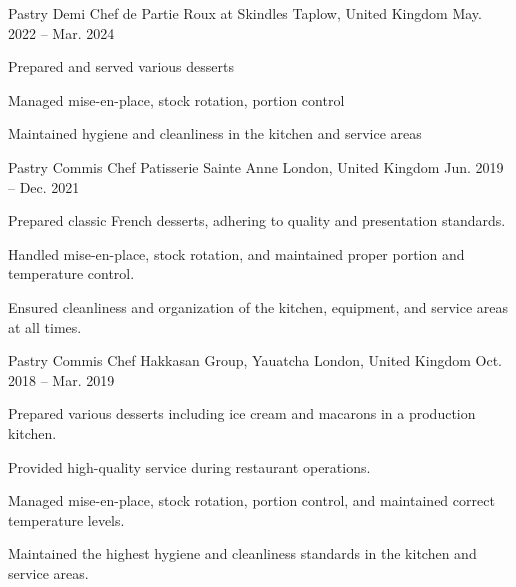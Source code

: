 

\begin{cventries}

  \cventry
    {Pastry Demi Chef de Partie} %
    {Roux at Skindles} %
    {Taplow, United Kingdom} %
    {May. 2022 -- Mar. 2024} %
    {
      \begin{cvitems} %
        \item {Prepared and served various desserts}
        \item {Managed mise-en-place, stock rotation, portion control}
        \item {Maintained hygiene and cleanliness in the kitchen and service areas}
      \end{cvitems}
    }

  \cventry
    {Pastry Commis Chef} %
    {Patisserie Sainte Anne} %
    {London, United Kingdom} %
    {Jun. 2019 -- Dec. 2021} %
    {
      \begin{cvitems} %
        \item {Prepared classic French desserts, adhering to quality and presentation standards.}
        \item {Handled mise-en-place, stock rotation, and maintained proper portion and temperature control.}
        \vfill\null
        \columnbreak
        \item {Ensured cleanliness and organization of the kitchen, equipment, and service areas at all times.}
      \end{cvitems}
    }

  \cventry
    {Pastry Commis Chef} %
    {Hakkasan Group, Yauatcha} %
    {London, United Kingdom} %
    {Oct. 2018 -- Mar. 2019} %
    {
      \begin{cvitems} %
        \item {Prepared various desserts including ice cream and macarons in a production kitchen.}
        \item {Provided high-quality service during restaurant operations.}
        \vfill\null
        \columnbreak
        \item {Managed mise-en-place, stock rotation, portion control, and maintained correct temperature levels.}
        \item {Maintained the highest hygiene and cleanliness standards in the kitchen and service areas.}
      \end{cvitems}
    }


\end{cventries}
